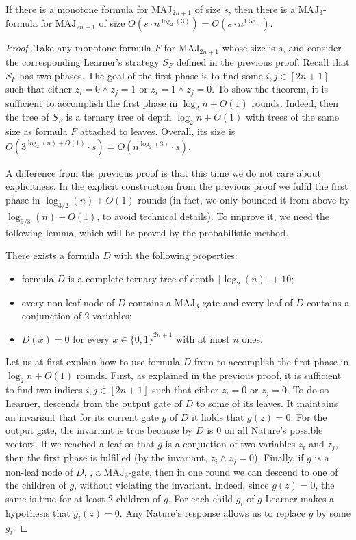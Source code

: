 \documentclass{toc}
\def\MAJ{\mathrm{MAJ}}
\begin{document}
\begin{theorem}
\label{transformation1}
If there is a monotone formula for $\MAJ_{2n + 1}$ of size $s$, then there is a $\MAJ_3$-formula for $\MAJ_{2n + 1}$ of size $O(s \cdot n^{\log_2(3)}) = O(s \cdot n^{1.58\ldots})$.
\end{theorem}
\begin{proof}
Take any monotone formula $F$ for $\MAJ_{2n + 1}$ whose size is $s$, and consider the corresponding Learner's strategy $S_F$ defined in the previous proof. Recall that $S_F$ has two phases. The goal of the first phase is to find some $i, j\in[2n + 1]$ such that either $z_i = 0\land z_j = 1$ or $z_i = 1\land z_j = 0$. To show the theorem, it is sufficient to accomplish the first phase in $\log_2 n + O(1)$ rounds. Indeed, then the tree of $S_F$ is a ternary tree of depth $\log_2 n  + O(1)$ with trees of the same size as formula $F$ attached to leaves. Overall, its size is $O(3^{\log_2(n) + O(1)} \cdot s) = O(n^{\log_2(3)} \cdot s)$. 

A difference from the previous proof is that this time we do not care about explicitness. In the explicit construction from the previous proof we fulfil the first phase in $\log_{3/2}(n) + O(1)$ rounds (in fact, we only bounded it from above by $\log_{9/8}(n) + O(1)$, to avoid technical details). To improve it, 
we need the following lemma, which will be proved by the probabilistic method.


\begin{lemma}
\label{valiant_lemma}
There exists a formula $D$ with the following properties:
\begin{itemize}
\item formula $D$ is a complete ternary tree of depth $\lceil\log_2(n)\rceil + 10$;
\item every non-leaf node of $D$ contains a $\MAJ_3$-gate and every leaf of $D$ contains a conjunction of 2 variables;
\item $D(x) = 0$ for every $x\in \{0, 1\}^{2n + 1}$ with at most $n$ ones.
\end{itemize}
\end{lemma}
Let us at first explain how to use formula $D$ from  to accomplish the first phase in $\log_2 n + O(1)$ rounds. First, as explained in the previous proof, it is sufficient to find two indices $i, j\in[2n + 1]$ such that either $z_i = 0$ or $z_j = 0$. To do so Learner, descends from the output gate of $D$ to some of its leaves. It %
 maintains an invariant that for its %
 current gate $g$ of $D$ it holds that $g(z) = 0$.  
For the output gate, the invariant is true because by  $D$ is $0$ on all Nature's possible vectors. If we reached a leaf so that $g$ is a conjuction of two variables $z_i$ and $z_j$, then the first phase is fulfilled (by the invariant, $z_i\land z_j = 0$). Finally, if $g$ is a non-leaf node of $D$, \ie, a $\MAJ_3$-gate, then in one round we can descend to one of the children of $g$, without violating the invariant. Indeed, since $g(z) = 0$, the same is true for at least $2$ children of $g$. For each child $g_i$ of $g$ Learner makes a hypothesis that $g_i(z) = 0$. Any Nature's response allows us to replace $g$ by some $g_i$. 


\end{proof}
\end{document}
